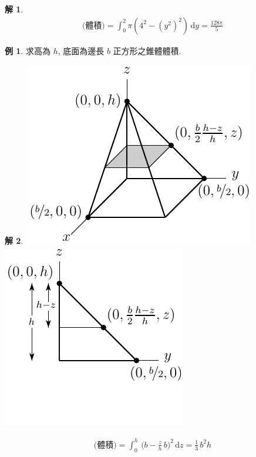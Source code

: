 \documentclass[12pt]{extarticle}
\theoremstyle{definition}
\newtheorem*{ex}{例}
\newtheorem*{sol}{解}
\begin{document}
\begin{sol}
\begin{minipage}{.65\textwidth}
  \end{minipage}
  \begin{minipage}{.35\textwidth}
    \begin{align*}
      \text{(體積)} = \int_0^2\!\pi(4^2 - (y^2)^2)\,\text{d}y = \frac{128\pi}{5}
    \end{align*}
  \end{minipage}
\end{sol}

\begin{ex}
  求高為 $h$, 底面為邊長 $b$ 正方形之錐體體積. 
\end{ex}

\begin{sol}
  \begin{minipage}{0.5\textwidth}
    \includegraphics[scale=.8,page=1]{pyramid}
    \includegraphics[scale=.8,page=1]{pyramidYZ}
  \end{minipage}
  \begin{minipage}{0.45\textwidth}
    \begin{align*}
      \text{(體積)} = \int_0^h\,\Big(b - \frac{z}{h}\,b\Big)^2\,\text{d}z = \frac{1}{3}\,b^2h
    \end{align*}
  \end{minipage}
\end{sol}
\end{document}
